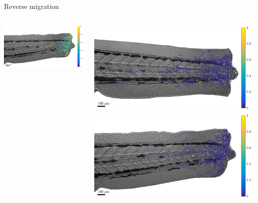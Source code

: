 \documentclass[mathserif,11pt]{beamer}
\begin{document}
\begin{frame}{Reverse migration}
\begin{columns}
\begin{column}{0.31\textwidth}
		\vspace{0.2cm}
		\includegraphics[scale=0.137]{Figures/mode2_rev9.png}
	\end{column}
	\begin{column}{0.31\textwidth}
		\vspace{-0.2cm}
		\includegraphics[scale=0.137]{Figures/mode3_rev2.png}\vfil
		\vspace{0.2cm}
		\includegraphics[scale=0.137]{Figures/mode3_rev9.png}
	\end{column}
\end{columns}

\end{frame}
\end{document}
